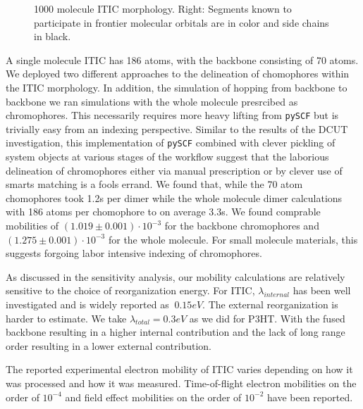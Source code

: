 \begin{figure}
\begin{subfigure}{.5\textwidth}
\end{subfigure}
\caption{1000 molecule ITIC morphology. Right: Segments known to participate in frontier
    molecular orbitals are in color and side chains in black.}
\label{ITIC}
\end{figure}

A single molecule ITIC has 186 atoms, with the backbone consisting of 70 atoms. We deployed two different
approaches to the delineation of chomophores within the ITIC morphology. In addition, the simulation of hopping
from backbone to backbone we ran simulations with the whole molecule presrcibed as chromophores. This
necessarily requires more heavy lifting from \texttt{pySCF} but is trivially easy from an indexing perspective.
Similar to the results of the DCUT investigation, 
this implementation of \texttt{pySCF} combined with clever pickling of system objects at various stages
of the workflow suggest that the laborious delineation of chromophores either via manual prescription or
by clever use of smarts matching is a fools errand. We found that, while the 70 atom chomophores took 1.2s
per dimer while the whole molecule dimer calculations with 186 atoms per chomophore to on average 3.3s.
We found comprable mobilities of $(1.019 \pm 0.001)\cdot 10^{-3}$ for the backbone chromophores and 
$(1.275 \pm 0.001)\cdot 10^{-3}$ for the whole molecule. 
For small molecule materials, this suggests forgoing labor intensive indexing of chromophores.

As discussed in the sensitivity analysis, our mobility calculations are relatively sensitive to the choice of
reorganization energy. For ITIC, $\lambda_{internal}$ has been well investigated and is widely reported as
$~0.15eV$. The external reorganization is harder to estimate. We take $\lambda_{total}=0.3eV$ as we did for
P3HT. With the fused
backbone resulting in a higher internal contribution and the lack of long range order resulting in a lower
external contribution. 

The reported experimental electron mobility of ITIC varies depending on how it was processed and how it was measured. 
Time-of-flight electron mobilities on the order of $10^{-4}$ \cite{Mica2018} and field effect mobilities on the order of
$10^{-2}$ \cite{Park2018} have been reported. 


